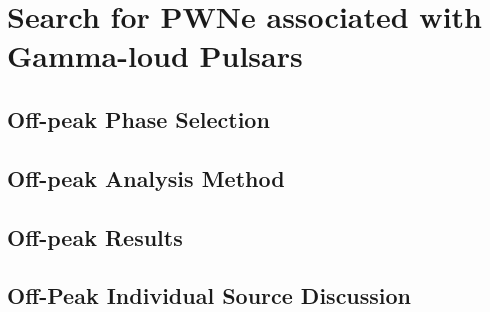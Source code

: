 
\chapter{Search for PWNe associated with Gamma-loud Pulsars}
\section{Off-peak Phase Selection}
\section{Off-peak Analysis Method}
\section{Off-peak Results}
\section{Off-Peak Individual Source Discussion}
